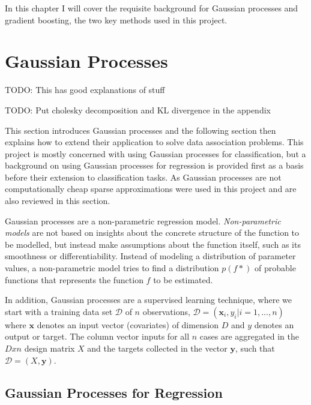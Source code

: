 \documentclass[12pt,a4paper]{report}
\theoremstyle{definition}
\begin{document}
In this chapter I will cover the requisite background for Gaussian processes and gradient boosting, the two key methods used in this project.

\section{Gaussian Processes}

\citep{Griffiths2023}

\citep{RasmussenWilliams2006}

\citep{Kaiser2017}

\citep{Yi2019} TODO: This has good explanations of stuff

TODO: Put cholesky decomposition and KL divergence in the appendix

This section introduces Gaussian processes and the following section then explains how to extend their application to solve data association problems. 
This project is mostly concerned with using Gaussian processes for classification, but a background on using Gaussian processes for regression is provided first as a basis before their extension to classification tasks. 
As Gaussian processes are not computationally cheap sparse approximations were used in this project and are also reviewed in this section.

Gaussian processes are a non-parametric regression model. 
\emph{Non-parametric models} are not based on insights about the concrete structure of the function to be modelled, but instead make assumptions about the function itself, such as its smoothness or differentiability. 
Instead of modeling a distribution of parameter values, a non-parametric model tries to find a distribution $p(f*)$ of probable functions that represents the function $f$ to be estimated.

In addition, Gaussian processes are a supervised learning technique, where we start with a training data set $\mathcal{D}$ of $n$ observations, $\mathcal{D} = (\textbf{x}_{i}, y_{i} | i = 1, ..., n)$ where $\textbf{x}$ denotes an input vector (covariates) of dimension $D$ and $y$ denotes an output or target. 
The column vector inputs for all $n$ cases are aggregated in the $D x n$ design matrix $X$ and the targets collected in the vector $\textbf{y}$, such that $\mathcal{D} = (X, \textbf{y})$.

\subsection{Gaussian Processes for Regression}
\end{document}
